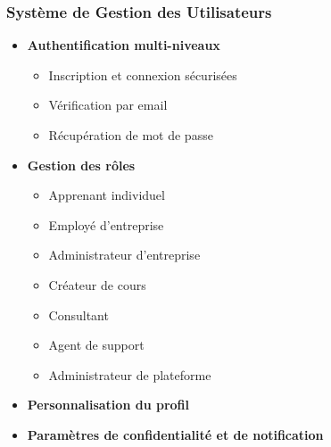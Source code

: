 \documentclass{beamer}
\begin{document}
\begin{frame}
\frametitle{Système de Gestion des Utilisateurs}
\begin{itemize}
    \item \textbf{Authentification multi-niveaux}
    \begin{itemize}
        \item Inscription et connexion sécurisées
        \item Vérification par email
        \item Récupération de mot de passe
    \end{itemize}
    \item \textbf{Gestion des rôles}
    \begin{itemize}
        \item Apprenant individuel
        \item Employé d'entreprise
        \item Administrateur d'entreprise
        \item Créateur de cours
        \item Consultant
        \item Agent de support
        \item Administrateur de plateforme
    \end{itemize}
    \item \textbf{Personnalisation du profil}
    \item \textbf{Paramètres de confidentialité et de notification}
\end{itemize}
\end{frame}
\end{document}

